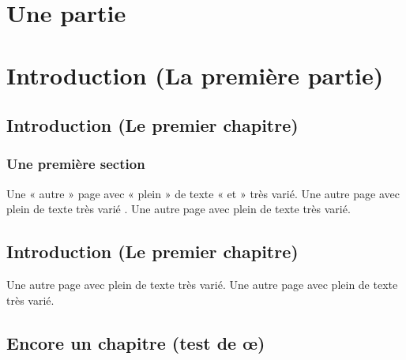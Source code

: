 \documentclass[11pt]{thesul}
\begin{document}
\tableofcontents




\DontNumberThisInToc
\part{Une partie}

\NoChapterHead

\DontWriteThisInToc   
\listoffigures

\WriteThisInToc
\FrameThisInToc
\NumberThisInToc
\part*{Introduction (La première partie)}

\mainmatter

\NumberThisInToc
\chapter*{Introduction (Le premier chapitre)}
\section{Une première section}

Une « autre » page avec « plein » de texte « et » très varié.
Une autre page avec plein de texte très varié .
Une autre page avec plein de texte très varié.

\DontFrameThisInToc
\chapter*{Introduction (Le premier chapitre)}

Une autre page avec plein de texte très varié.
Une autre page avec plein de texte très varié.

\chapter{Encore un chapitre (test de \oe)}
\end{document}
